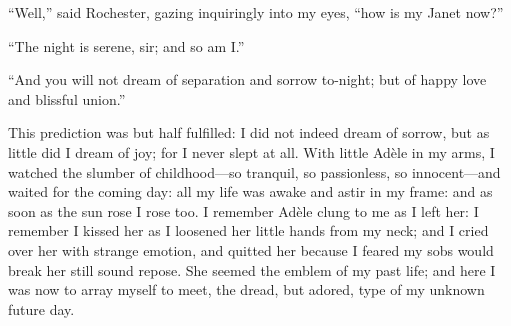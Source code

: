 \enquote{Well,} said \Mr{} Rochester, gazing inquiringly into my eyes,
\enquote{how is my Janet now?}

\enquote{The night is serene, sir; and so am I\@.}

\enquote{And you will not dream of separation and sorrow to-night; but
	of happy love and blissful union.}

This prediction was but half fulfilled: I did not indeed dream of
sorrow, but as little did I dream of joy; for I never slept at all.
With little Adèle in my arms, I watched the slumber of childhood---so
tranquil, so passionless, so innocent---and waited for the coming day:
all my life was awake and astir in my frame: and as soon as the sun rose
I rose too.  I remember Adèle clung to me as I left her: I remember I
kissed her as I loosened her little hands from my neck; and I cried over
her with strange emotion, and quitted her because I feared my sobs would
break her still sound repose.  She seemed the emblem of my past life;
and here I was now to array myself to meet, the dread, but adored, type
of my unknown future day.
